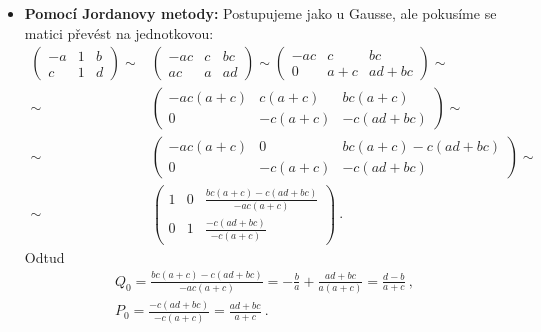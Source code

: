 \begin{example}
\begin{itemize}
        \item \textbf{Pomocí Jordanovy metody:}
        Postupujeme jako u Gausse, ale pokusíme se matici převést na jednotkovou:
        \begin{align}
            \left(\begin{array}{cc|c}
                -a & 1 & b \\ c & 1 & d
            \end{array}\right)
            \sim&
            \left(\begin{array}{cc|c}
                -ac & c & bc \\ ac & a & ad
            \end{array}\right)
            \sim
            \left(\begin{array}{cc|c}
                -ac & c & bc \\ 0 & a+c & ad+bc
            \end{array}\right)
            \sim \\ \sim&
            \left(\begin{array}{cc|c}
                -ac(a+c) & c(a+c) & bc(a+c) \\ 0 & -c(a+c) & -c(ad+bc)
            \end{array}\right)
            \sim \\ \sim&
            \left(\begin{array}{cc|c}
                -ac(a+c) & 0 & bc(a+c)-c(ad+bc) \\ 0 & -c(a+c) & -c(ad+bc)
            \end{array}\right)
            \sim \\ \sim&
            \left(\begin{array}{cc|c}
                1 & 0 & \frac{bc(a+c)-c(ad+bc)}{-ac(a+c)} \\ 0 & 1 & \frac{-c(ad+bc)}{-c(a+c)}
            \end{array}\right) \:.
        \end{align}
        Odtud
        \begin{align}
            \boxed{Q_0 =} \frac{bc(a+c)-c(ad+bc)}{-ac(a+c)} = - \frac{b}{a} + \frac{ad+bc}{a(a+c)} \boxed{= \frac{d-b}{a+c} } \:,\\
            \boxed{P_0 =} \frac{-c(ad+bc)}{-c(a+c)} \boxed{= \frac{ad+bc}{a+c} } \:.
        \end{align}


\end{itemize}
\end{example}
